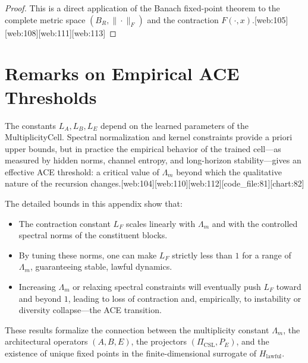 \documentclass[11pt]{article}
\theoremstyle{definition}
\theoremstyle{plain}
\begin{document}
\begin{proof}
This is a direct application of the Banach fixed-point theorem to the complete metric space $(B_R,\|\cdot\|_F)$ and the contraction $F(\cdot,x)$.[web:105][web:108][web:111][web:113]
\end{proof}

\section{Remarks on Empirical ACE Thresholds}

The constants $L_A,L_B,L_E$ depend on the learned parameters of the MultiplicityCell.
Spectral normalization and kernel constraints provide a priori upper bounds, but in practice the empirical behavior of the trained cell---as measured by hidden norms, channel entropy, and long-horizon stability---gives an effective ACE threshold: a critical value of $\Lambda_m$ beyond which the qualitative nature of the recursion changes.[web:104][web:110][web:112][code_file:81][chart:82]

The detailed bounds in this appendix show that:
\begin{itemize}[leftmargin=*]
  \item The contraction constant $L_F$ scales linearly with $\Lambda_m$ and with the controlled spectral norms of the constituent blocks.
  \item By tuning these norms, one can make $L_F$ strictly less than $1$ for a range of $\Lambda_m$, guaranteeing stable, lawful dynamics.
  \item Increasing $\Lambda_m$ or relaxing spectral constraints will eventually push $L_F$ toward and beyond $1$, leading to loss of contraction and, empirically, to instability or diversity collapse---the ACE transition.
\end{itemize}

These results formalize the connection between the multiplicity constant $\Lambda_m$, the architectural operators $(A,B,E)$, the projectors $(\Pi_{\mathrm{CSL}},P_E)$, and the existence of unique fixed points in the finite-dimensional surrogate of $H_{\mathrm{lawful}}$.

\nocite{*}


\end{document}
